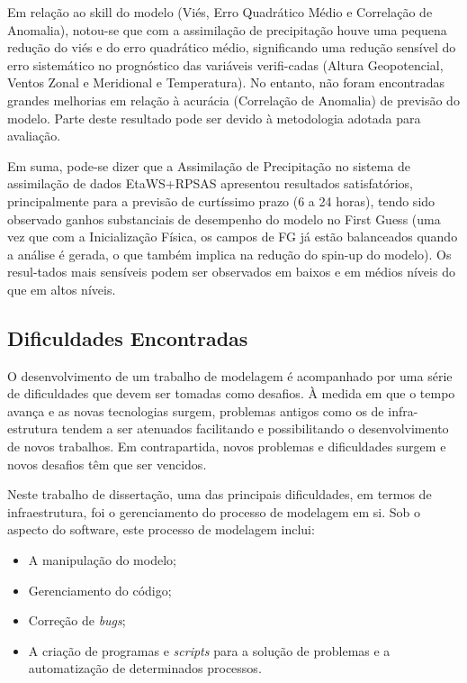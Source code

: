 Em relação ao skill do modelo (Viés, Erro Quadrático Médio e Correlação de Anomalia), notou-se que com a assimilação de precipitação houve uma pequena redução do viés e do erro quadrático médio, significando uma redução sensível do erro sistemático no prognóstico das variáveis verifi-cadas (Altura Geopotencial, Ventos Zonal e Meridional e Temperatura). No entanto, não foram encontradas grandes melhorias em relação à acurácia (Correlação de Anomalia) de previsão do modelo. Parte deste resultado pode ser devido à metodologia adotada para avaliação.

Em suma, pode-se dizer que a Assimilação de Precipitação no sistema de assimilação de dados EtaWS+RPSAS apresentou resultados satisfatórios, principalmente para a previsão de curtíssimo prazo (6 a 24 horas), tendo sido observado ganhos substanciais de desempenho do modelo no First Guess (uma vez que com a Inicialização Física, os campos de FG já estão balanceados quando a análise é gerada, o que também implica na redução do spin-up do modelo). Os resul-tados mais sensíveis podem ser observados em baixos e em médios níveis do que em altos níveis.

\subsection{Dificuldades Encontradas}

O desenvolvimento de um trabalho de modelagem é acompanhado por uma série de dificuldades que devem ser tomadas como desafios. À medida em que o tempo avança e as novas tecnologias surgem, problemas antigos como os de infra-estrutura tendem a ser atenuados facilitando e possibilitando o desenvolvimento de novos trabalhos. Em contrapartida, novos problemas e dificuldades surgem e novos desafios têm que ser vencidos.

Neste trabalho de dissertação, uma das principais dificuldades, em termos de infraestrutura, foi o gerenciamento do processo de modelagem em si. Sob o aspecto do software, este processo de modelagem inclui:

\begin{itemize}
\item A manipulação do modelo;
\item Gerenciamento do código;
\item Correção de \textit{bugs};
\item A criação de programas e \textit{scripts} para a solução de problemas e a \-au\-to\-ma\-ti\-za\-ção de determinados processos.
\end{itemize}

